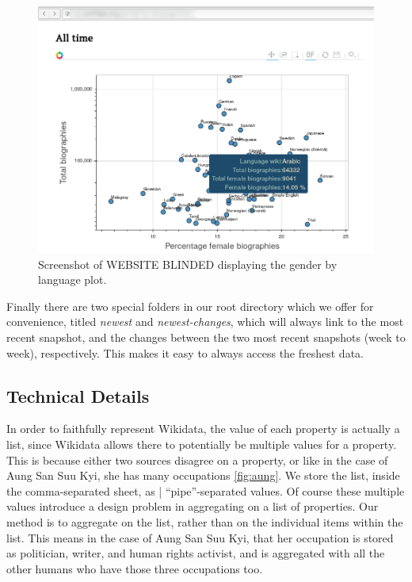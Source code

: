 \documentclass[letterpaper]{article}
\begin{document}
\begin{figure}
\label{fig:screenshot2}
\includegraphics[scale=0.25]{figures/screenshot2.png} 
\caption{Screenshot of WEBSITE BLINDED displaying the gender by language plot.}
\end{figure}

Finally there are two special folders in our root directory which we offer for convenience,  titled \textit{newest} and \textit{newest-changes}, which will always link to the most recent snapshot, and the changes between the two most recent snapshots (week to week), respectively. This makes it easy to always access the freshest data.

\subsection{Technical Details}
In order to faithfully represent Wikidata, the value of each property is actually a list, since Wikidata allows there to potentially be multiple values for a property. This is because either two sources disagree on a property, or like in the case of Aung San Suu Kyi, she has many occupations \ref{fig:aung}. We store the list, inside the comma-separated sheet, as | ``pipe''-separated values. Of course these multiple values introduce a design problem in aggregating on a list of properties. Our method is to aggregate on the list, rather than on the individual items within the list. This means in the case of Aung San Suu Kyi, that her occupation is stored as politician, writer, and human rights activist, and is aggregated with all the other humans who have those three occupations too.
\end{document}
